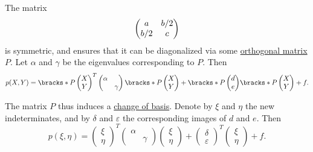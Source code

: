 \begin{algorithm}
  The matrix
  \begin{equation*}
    \begin{pmatrix}
      a          & \ifrac b 2 \\
      \ifrac b 2 & c
    \end{pmatrix}
  \end{equation*}
  is symmetric, and  ensures that it can be diagonalized via some \hyperref[def:unitary_matrix]{orthogonal matrix} \( P \). Let \( \alpha \) and \( \gamma \) be the eigenvalues corresponding to \( P \). Then
  \begin{equation*}
    p(X, Y)
    =
    \bracks*
      {
        P
        \begin{pmatrix}
          X \\ Y
        \end{pmatrix}
      }^T
    \begin{pmatrix}
      \alpha &       \\
             & \gamma
    \end{pmatrix}
    \bracks*
      {
        P
        \begin{pmatrix}
          X \\ Y
        \end{pmatrix}
      }
    +
    \bracks*
      {
        P
        \begin{pmatrix}
          d \\ e
        \end{pmatrix}
      }
    \bracks*
      {
        P
        \begin{pmatrix}
          X \\ Y
        \end{pmatrix}
      }
    +
    f.
  \end{equation*}

  The matrix \( P \) thus induces a \hyperref[rem:change_of_basis]{change of basis}. Denote by \( \xi \) and \( \eta \) the new indeterminates, and by \( \delta \) and \( \varepsilon \) the corresponding images of \( d \) and \( e \). Then
  \begin{equation*}
    p(\xi, \eta)
    =
    \begin{pmatrix}
      \xi \\ \eta
    \end{pmatrix}^T
    \begin{pmatrix}
      \alpha &       \\
             & \gamma
    \end{pmatrix}
    \begin{pmatrix}
      \xi \\ \eta
    \end{pmatrix}
    +
    \begin{pmatrix}
      \delta \\ \varepsilon
    \end{pmatrix}^T
    \begin{pmatrix}
      \xi \\ \eta
    \end{pmatrix}
    +
    f.
  \end{equation*}


\end{algorithm}

